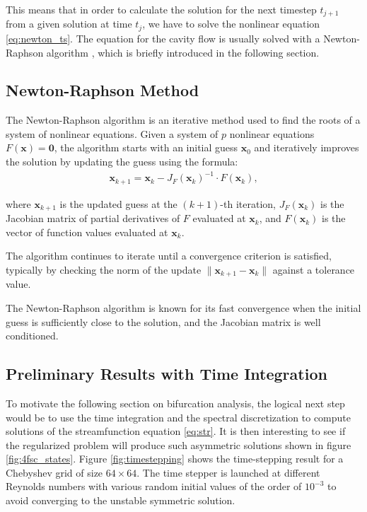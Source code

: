This means that in order to calculate the solution for the next timestep
$t_{j+1}$ from a given solution at time $t_j$, we have to solve the nonlinear
equation \eqref{eq:newton_ts}. The equation for the cavity flow is usually
solved with a Newton-Raphson algorithm \citep{kuhlmann2019}, which is briefly
introduced in the following section. 

\subsection{Newton-Raphson Method}

The Newton-Raphson algorithm is an iterative method used to find the roots of a
system of nonlinear equations. Given a system of $p$ nonlinear equations
$F(\mathbf{x}) = \mathbf{0}$, the algorithm starts with an initial guess
$\mathbf{x}_0$ and iteratively improves the solution by updating the guess
using the formula:
\begin{align} 
\mathbf{x}_{k+1} = \mathbf{x}_k - J_F(\mathbf{x}_k)^{-1} \cdot F(\mathbf{x}_k),
\end{align}

where $\mathbf{x}_{k+1}$ is the updated guess at the $(k+1)$-th iteration,
$J_F(\mathbf{x}_k)$ is the Jacobian matrix of partial derivatives of $F$
evaluated at $\mathbf{x}_k$, and $F(\mathbf{x}_k)$ is the vector of function
values evaluated at $\mathbf{x}_k$.

The algorithm continues to iterate until a convergence criterion is satisfied,
typically by checking the norm of the update $\|\mathbf{x}_{k+1} -
\mathbf{x}_k\|$ against a tolerance value.

The Newton-Raphson algorithm is known for its fast convergence when the initial
guess is sufficiently close to the solution, and the Jacobian matrix is well
conditioned.

\subsection{Preliminary Results with Time Integration}

To motivate the following section on bifurcation analysis, the logical next
step would be to use the time integration and the spectral discretization to
compute solutions of the streamfunction equation \eqref{eq:str}. It is then
interesting to see if the regularized problem will produce such asymmetric
solutions shown in figure \ref{fig:4fsc_states}. Figure \ref{fig:timestepping}
shows the time-stepping result for a Chebyshev grid of size $64 \times 64$. The
time stepper is launched at different Reynolds numbers with various random
initial values of the order of $10^{-3}$ to avoid converging to the unstable
symmetric solution.

